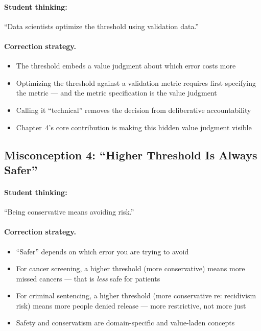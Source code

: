 \paragraph{Student thinking:} ``Data scientists optimize the threshold using validation data.''

\paragraph{Correction strategy.}
\begin{itemize}
    \item The threshold embeds a value judgment about which error costs more
    \item Optimizing the threshold against a validation metric requires first specifying the metric --- and the metric specification is the value judgment
    \item Calling it ``technical'' removes the decision from deliberative accountability
    \item Chapter~4's core contribution is making this hidden value judgment visible
\end{itemize}

\subsection{Misconception 4: ``Higher Threshold Is Always Safer''}

\paragraph{Student thinking:} ``Being conservative means avoiding risk.''

\paragraph{Correction strategy.}
\begin{itemize}
    \item ``Safer'' depends on which error you are trying to avoid
    \item For cancer screening, a higher threshold (more conservative) means more missed cancers --- that is \emph{less} safe for patients
    \item For criminal sentencing, a higher threshold (more conservative re: recidivism risk) means more people denied release --- more restrictive, not more just
    \item Safety and conservatism are domain-specific and value-laden concepts
\end{itemize}

